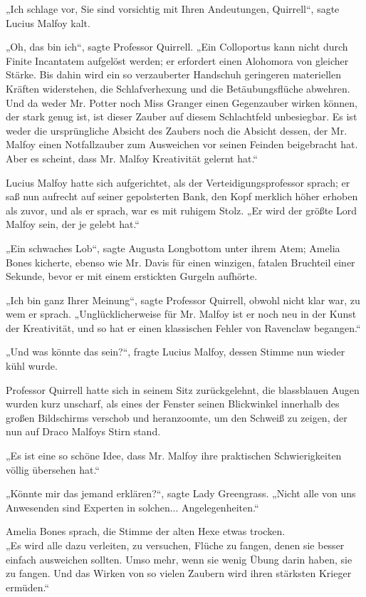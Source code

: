 {„Ich schlage vor, Sie sind vorsichtig mit Ihren Andeutungen, Quirrell“, sagte Lucius Malfoy kalt.

„Oh, das bin ich“, sagte Professor Quirrell. „Ein Colloportus kann nicht durch Finite Incantatem aufgelöst werden; er erfordert einen Alohomora von gleicher Stärke. Bis dahin wird ein so verzauberter Handschuh geringeren materiellen Kräften widerstehen, die Schlafverhexung und die Betäubungsflüche abwehren. Und da weder Mr. Potter noch Miss Granger einen Gegenzauber wirken können, der stark genug ist, ist dieser Zauber auf diesem Schlachtfeld unbesiegbar. Es ist weder die ursprüngliche Absicht des Zaubers noch die Absicht dessen, der Mr. Malfoy einen Notfallzauber zum Ausweichen vor seinen Feinden beigebracht hat. Aber es scheint, dass Mr. Malfoy Kreativität gelernt hat.“

Lucius Malfoy hatte sich aufgerichtet, als der Verteidigungsprofessor sprach; er saß nun aufrecht auf seiner gepolsterten Bank, den Kopf merklich höher erhoben als zuvor, und als er sprach, war es mit ruhigem Stolz. „Er wird der größte Lord Malfoy sein, der je gelebt hat.“

„Ein schwaches Lob“, sagte Augusta Longbottom unter ihrem Atem; Amelia Bones kicherte, ebenso wie Mr. Davis für einen winzigen, fatalen Bruchteil einer Sekunde, bevor er mit einem erstickten Gurgeln aufhörte.

„Ich bin ganz Ihrer Meinung“, sagte Professor Quirrell, obwohl nicht klar war, zu wem er sprach. „Unglücklicherweise für Mr. Malfoy ist er noch neu in der Kunst der Kreativität, und so hat er einen klassischen Fehler von Ravenclaw begangen.“

„Und was könnte das sein?“, fragte Lucius Malfoy, dessen Stimme nun wieder kühl wurde.

Professor Quirrell hatte sich in seinem Sitz zurückgelehnt, die blassblauen Augen wurden kurz unscharf, als eines der Fenster seinen Blickwinkel innerhalb des großen Bildschirms verschob und heranzoomte, um den Schweiß zu zeigen, der nun auf Draco Malfoys Stirn stand.

„Es ist eine so schöne Idee, dass Mr. Malfoy ihre praktischen Schwierigkeiten völlig übersehen hat.“

„Könnte mir das jemand erklären?“, sagte Lady Greengrass. „Nicht alle von uns Anwesenden sind Experten in solchen... Angelegenheiten.“

Amelia Bones sprach, die Stimme der alten Hexe etwas trocken.\\ „Es wird alle dazu verleiten, zu versuchen, Flüche zu fangen, denen sie besser einfach ausweichen sollten. Umso mehr, wenn sie wenig Übung darin haben, sie zu fangen. Und das Wirken von so vielen Zaubern wird ihren stärksten Krieger ermüden.“

}
